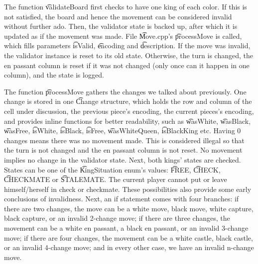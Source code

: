 The function \t{validateBoard} first checks to have one king of each color. If this is not satisfied, the board and hence the movement can be considered invalid without further ado. Then, the validator state is backed up, after which it is updated as if the movement was made. File \t{Move.cpp}'s \t{processMove} is called, which fills parameters \t{isValid}, \t{encoding} and \t{description}. If the move was invalid, the validator instance is reset to its old state. Otherwise, the turn is changed, the en passant column is reset if it was not changed (only once can it happen in one column), and the state is logged.

The function \t{processMove} gathers the changes we talked about previously. One change is stored in one \t{Change} structure, which holds the row and column of the cell under discussion, the previous piece's encoding, the current pieces's encoding, and provides inline functions for better readability, such as \t{wasWhite}, \t{wasBlack}, \t{wasFree}, \t{isWhite}, \t{isBlack}, \t{isFree}, \t{wasWhiteQueen}, \t{isBlackKing} etc. Having 0 changes means there was no movement made. This is considered illegal so that the turn is not changed and the en passant column is not reset. No movement implies no change in the validator state. Next, both kings' states are checked. States can be one of the \t{KingSituation} enum's values: \t{FREE}, \t{CHECK}, \t{CHECKMATE} or \t{STALEMATE}. The current player cannot put or leave himself/herself in check or checkmate. These possibilities also provide some early conclusions of invalidness. Next, an if statement comes with four branches: if there are two changes, the move can be a white move, black move, white capture, black capture, or an invalid 2-change move; if there are three changes, the movement can be a white en passant, a black en passant, or an invalid 3-change move; if there are four changes, the movement can be a white castle, black castle, or an invalid 4-change move; and in every other case, we have an invalid n-change move.

